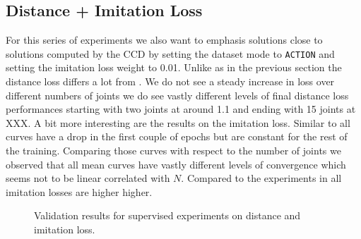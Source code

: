 \subsection{Distance + Imitation Loss}

For this series of experiments we also want to emphasis solutions close to solutions computed by the CCD by setting the dataset mode to \texttt{ACTION} and setting the imitation loss weight to 0.01. Unlike as in the previous section the distance loss differs a lot from . We do not see a steady increase in loss over different numbers of joints we do see vastly different levels of final distance loss performances starting with two joints at around 1.1 and ending with 15 joints at XXX.
A bit more interesting are the results on the imitation loss. Similar to  all curves have a drop in the first couple of epochs but are constant for the rest of the training. Comparing those curves with respect to the number of joints we observed that all mean curves have vastly different levels of convergence which seems not to be linear correlated with $N$. Compared to the experiments in  all imitation losses are higher higher. 

\begin{figure}
    \begin{center}
        \hfill
    \end{center}
    \caption[Supervised Distance and Imitation Loss]{Validation results for supervised experiments on distance and imitation loss. }
    \label{fig:supervised_imitation}
\end{figure}


